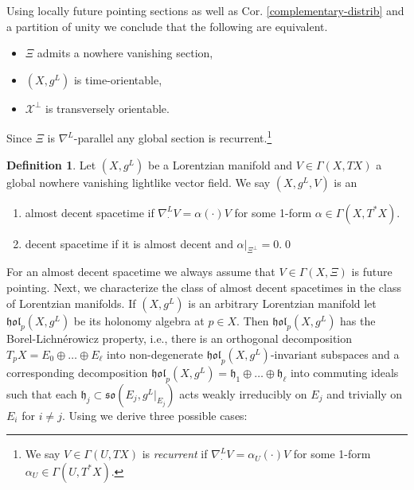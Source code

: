 \documentclass[a4paper,10pt,twoside]{amsart}
\theoremstyle{definition}
\newtheorem{definition}[theorem]{Definition}
\theoremstyle{remark}
\numberwithin{equation}{section}
\begin{document}
Using locally future pointing sections as well as Cor. \ref{complementary-distrib} and a partition of unity we conclude that the following are equivalent.
\begin{itemize}
	\item
	$\Xi$ admits a nowhere vanishing section,
	\item
	$(X,g^{L})$ is time-orientable,
	\item
	$\mathcal{X}^{\perp}$ is transversely orientable.
\end{itemize}
Since $\Xi$ is $\nabla^{L}$-parallel any global section is recurrent.\footnote{We say $V \in \Gamma(U,TX)$ is {\em recurrent} if
										$\nabla^{L}_{\cdot}{V} = \alpha_{U}(\cdot)V$ for some 1-form
										$\alpha_{U} \in \Gamma(U,T^{*}X)$.}
\begin{definition}
	Let $(X,g^{L})$ be a Lorentzian manifold and $V \in \Gamma(X,TX)$ a global nowhere vanishing lightlike vector field.
	We say $(X,g^{L},V)$ is an
	\begin{enumerate}
		\item
		almost decent spacetime if $\nabla^{L}_{\cdot}{V} = \alpha(\cdot)V$ for some 1-form $\alpha \in \Gamma(X,T^{*}X)$.
		\item
		decent spacetime if it is almost decent and $\alpha|_{\Xi^{\perp}}=0$.\qed
	\end{enumerate}
\end{definition}
For an almost decent spacetime we always assume that $V \in \Gamma(X,\Xi)$ is future pointing. Next, we characterize the class of almost decent
spacetimes in the class of Lorentzian manifolds. If $(X,g^{L})$ is an arbitrary Lorentzian manifold let ${\mathfrak{{hol}}}_{p}(X,g^{L})$ be its holonomy
algebra at $p \in X$. Then ${\mathfrak{{hol}}}_{p}(X,g^{L})$ has the Borel-Lichn\'erowicz property, i.e., there is an orthogonal decomposition
$T_{p}X=E_{0} \oplus \ldots \oplus E_{\ell}$ into non-degenerate ${\mathfrak{{hol}}}_{p}(X,g^{L})$-invariant subspaces and a corresponding decomposition
${\mathfrak{{hol}}}_{p}(X,g^{L})={\mathfrak{{h}}}_{1}\oplus \ldots \oplus {\mathfrak{{h}}}_{\ell}$ into commuting ideals such that each
${\mathfrak{{h}}}_{j} \subset {\mathfrak{{so}}}(E_{j},g^{L}|_{E_{j}})$ acts weakly irreducibly on $E_{j}$ and trivially on $E_{i}$ for $i \neq j$. Using
\cite{MR1836778} we derive three possible cases:
\end{document}
